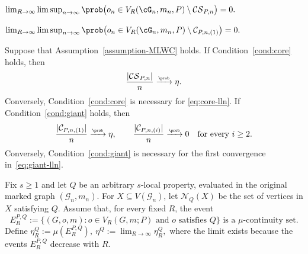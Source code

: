 \documentclass[11pt]{article}
\theoremstyle{plain}
\begin{document}
\begin{condition}
\label{cond:core}
$\lim_{R\to\infty}\limsup_{n\to\infty}
\prob\bigl(o_n\in V_R(\cG_n,m_n,P)\setminus\mathcal{CS}_{P,n}\bigr)=0.$
\end{condition}

\begin{condition}
\label{cond:giant}
$\lim_{R\to\infty}\limsup_{n\to\infty}
\prob\bigl(o_n\in V_R(\cG_n,m_n,P)\setminus\mathcal{C}_{P,n,(1)}\bigr)=0.
$
\end{condition}

\begin{theorem}
\label{thm:almost-local}
Suppose that Assumption~\ref{assumption-MLWC} holds.
If Condition~\ref{cond:core} holds, then
\begin{equation}\label{eq:core-lln}
\frac{|\mathcal{CS}_{P,n}|}{n}
\xrightarrow{\scriptscriptstyle\prob}\eta.
\end{equation}
Conversely, Condition~\ref{cond:core} is necessary for
\eqref{eq:core-lln}. If Condition~\ref{cond:giant} holds, then
\begin{equation}\label{eq:giant-lln}
\frac{|\mathcal{C}_{P,n,(1)}|}{n}
\xrightarrow{\scriptscriptstyle\prob}\eta,
\qquad
\frac{|\mathcal{C}_{P,n,(i)}|}{n}
\xrightarrow{\scriptscriptstyle\prob}0
\quad\text{for every }i\ge2.
\end{equation}
Conversely, Condition~\ref{cond:giant} is necessary for the first
convergence in~\eqref{eq:giant-lln}.
\end{theorem}

Fix $s\ge1$ and let $Q$ be an arbitrary $s$-local property, evaluated in the original marked graph $(\mathcal G_n,m_n)$. For
$X\subseteq V(\mathcal G_n)$, let $\mathcal N_Q(X)$ be the set of vertices in
$X$ satisfying $Q$. Assume that, for every fixed $R$, the event
\begin{equation}\label{eq:continuity-set-property}
    E_R^{P,Q}:=\{(G,o,m):o\in V_R(G,m;P)\text{ and }o\text{ satisfies }Q\} \text{ is a $\mu$-continuity set.}
\end{equation}
Define
\(
\eta_R^Q:=\mu(E_R^{P,Q}),\
\eta^Q:=\lim_{R\to\infty}\eta_R^Q,
\)
where the limit exists because the events $E_R^{P,Q}$ decrease with $R$.
\end{document}
